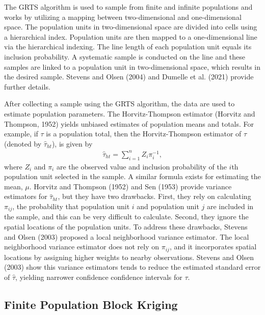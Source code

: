 \documentclass[]{elsarticle} %
\begin{document}
The GRTS algorithm is used to sample from finite and infinite
populations and works by utilizing a mapping between two-dimensional and
one-dimensional space. The population units in two-dimensional space are
divided into cells using a hierarchical index. Population units are then
mapped to a one-dimensional line via the hierarchical indexing. The line
length of each population unit equals its inclusion probability. A
systematic sample is conducted on the line and these samples are linked
to a population unit in two-dimensional space, which results in the
desired sample. Stevens and Olsen (2004) and Dumelle et al. (2021)
provide further details.

After collecting a sample using the GRTS algorithm, the data are used to
estimate population parameters. The Horvitz-Thompson estimator (Horvitz
and Thompson, 1952) yields unbiased estimates of population means and
totals. For example, if \(\tau\) is a population total, then the
Horvitz-Thompson estimator of \(\tau\) (denoted by \(\hat{\tau}_{ht}\)),
is given by \begin{align}\label{eq:ht}
  \hat{\tau}_{ht} = \sum_{i = 1}^n Z_i \pi_i^{-1},
\end{align} where \(Z_i\) and \(\pi_i\) are the observed value and
inclusion probability of the \(i\)th population unit selected in the
sample. A similar formula exists for estimating the mean, \(\mu\).
Horvitz and Thompson (1952) and Sen (1953) provide variance estimators
for \(\hat{\tau}_{ht}\), but they have two drawbacks. First, they rely
on calculating \(\pi_{ij}\), the probability that population unit \(i\)
and population unit \(j\) are included in the sample, and this can be
very difficult to calculate. Second, they ignore the spatial locations
of the population units. To address these drawbacks, Stevens and Olsen
(2003) proposed a local neighborhood variance estimator. The local
neighborhood variance estimator does not rely on \(\pi_{ij}\), and it
incorporates spatial locations by assigning higher weights to nearby
observations. Stevens and Olsen (2003) show this variance estimators
tends to reduce the estimated standard error of \(\hat{\tau}\), yielding
narrower confidence confidence intervals for \(\tau\).

\hypertarget{finite-population-block-kriging}{%
\subsection{Finite Population Block
Kriging}\label{finite-population-block-kriging}}
\end{document}
